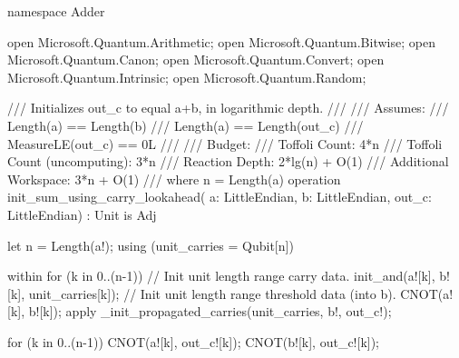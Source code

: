 \documentclass[onecolumn,unpublished]{quantumarticle}
\theoremstyle{definition}
\theoremstyle{definition}
\theoremstyle{definition}
\begin{document}
\begin{qsharp}
namespace Adder {
    open Microsoft.Quantum.Arithmetic;
    open Microsoft.Quantum.Bitwise;
    open Microsoft.Quantum.Canon;
    open Microsoft.Quantum.Convert;
    open Microsoft.Quantum.Intrinsic;
    open Microsoft.Quantum.Random;

    /// Initializes out_c to equal a+b, in logarithmic depth.
    ///
    /// Assumes:
    ///     Length(a) == Length(b)
    ///     Length(a) == Length(out_c)
    ///     MeasureLE(out_c) == 0L
    ///
    /// Budget:
    ///     Toffoli Count: 4*n
    ///     Toffoli Count (uncomputing): 3*n
    ///     Reaction Depth: 2*lg(n) + O(1)
    ///     Additional Workspace: 3*n + O(1)
    ///     where n = Length(a)
    operation init_sum_using_carry_lookahead(
            a: LittleEndian,
            b: LittleEndian,
            out_c: LittleEndian) : Unit is Adj {
        let n = Length(a!);
        using (unit_carries = Qubit[n]) {
            within {
                for (k in 0..(n-1)) {
                    // Init unit length range carry data.
                    init_and(a![k], b![k], unit_carries[k]);
                    // Init unit length range threshold data (into b).
                    CNOT(a![k], b![k]);
                }
            } apply {
                _init_propagated_carries(unit_carries, b!, out_c!);
            }

            for (k in 0..(n-1)) {
                CNOT(a![k], out_c![k]);
                CNOT(b![k], out_c![k]);
            }
        }
    }

}
\end{qsharp}
\end{document}
